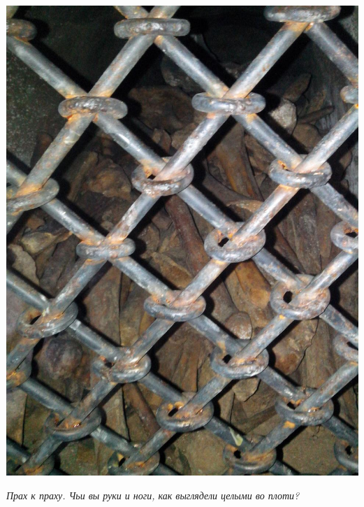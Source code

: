 \newpage

\vspace*{\fill}
\begin{center}
\includegraphics[width=\linewidth]{chast-colebanie-osnov/nachalo/IMG_20170626_135243.jpg}

\textit{Прах к праху. Чьи вы руки и ноги, как выглядели целыми во плоти?}
\end{center}
\vspace*{\fill}
\newpage
\vspace*{\fill}
